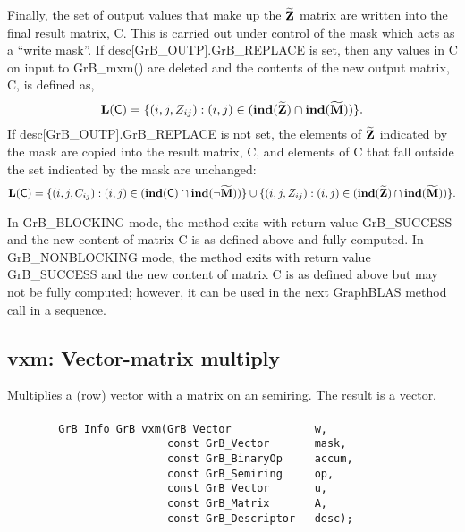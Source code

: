 Finally, the set of output values that make up the ${\bf \widetilde{Z}}$ 
matrix are written into the final result matrix, {\sf C}. 
This is carried out under control of the mask which acts as a ``write mask''.
If {\sf desc[GrB\_OUTP].GrB\_REPLACE} is set, then any values in {\sf C} on 
input to {\sf GrB\_mxm()} are deleted and the contents of the new output matrix,
{\sf C}, is defined as,
\[ 
\bold{L}({\sf C}) = \{(i,j,Z_{ij}) : (i,j) \in (\bold{ind}({\bf \widetilde{Z}}) 
\cap \bold{ind}({\bf \widetilde{M}})) \}. 
\]
If {\sf desc[GrB\_OUTP].GrB\_REPLACE} is not set, the elements of 
${\bf \widetilde{Z}}$ indicated by the mask are copied into the result 
matrix, {\sf C}, and elements of {\sf C} that fall outside the set 
indicated by the mask are unchanged:
\[ 
\bold{L}({\sf C}) = \{(i,j,C_{ij}) : (i,j) \in (\bold{ind}({\bf \sf C}) \cap \bold{ind}(\neg {\bf \widetilde{M}})) \} \cup \{(i,j,Z_{ij}) : (i,j) \in (\bold{ind}({\bf \widetilde{Z}}) \cap \bold{ind}({\bf \widetilde{M}})) \}. 
\]

In {\sf GrB\_BLOCKING} mode, the method exits with return value {\sf GrB\_SUCCESS} and the new content of matrix {\sf C} is as defined above and fully computed.
In {\sf GrB\_NONBLOCKING} mode, the method exits with return value {\sf GrB\_SUCCESS} and the new content of matrix {\sf C} is as defined above but may not be fully computed; however, it can be used in the next GraphBLAS 
method call in a sequence.


\subsection{{\sf vxm}: Vector-matrix multiply}

Multiplies a (row) vector with a matrix on an semiring. The result is a vector.

\paragraph{\syntax}

\begin{verbatim}
        GrB_Info GrB_vxm(GrB_Vector             w,
                         const GrB_Vector       mask,
                         const GrB_BinaryOp     accum,
                         const GrB_Semiring     op,
                         const GrB_Vector       u, 
                         const GrB_Matrix       A,
                         const GrB_Descriptor   desc);
\end{verbatim}

